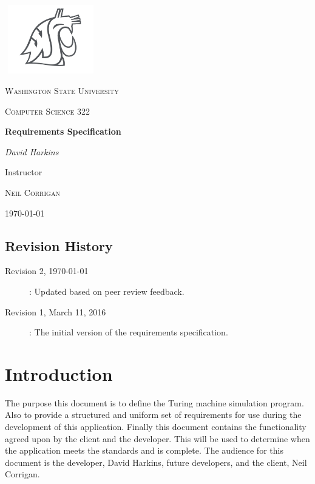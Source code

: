 \documentclass{report}
\begin{document}
 
 \begin{titlepage}
	\centering
    \includegraphics[width=4cm, height=3cm]{head-white-gray-big.png}

	{\scshape\LARGE Washington State University \par}
	\vspace{1cm}
	{\scshape\Large Computer Science 322\par}
	\vspace{1.5cm}
	{\huge\bfseries Requirements Specification\par}
	\vspace{2cm}
	{\Large\itshape David Harkins\par}
	\vfill
	Instructor\par
	\textsc{Neil Corrigan}

	\vfill
	{\large \today\par}
\end{titlepage}
\pagebreak
 
\tableofcontents{}
\pagebreak

\listoffigures

\section*{Revision History}

\begin{description}
\item[Revision 2, \today]: Updated based on peer review feedback. 
\item[Revision 1, March 11, 2016]: The initial version of the requirements specification.
\end{description} 
\pagebreak

\chapter{Introduction}
 	The purpose this document is to define the Turing machine simulation program. Also to provide a structured and uniform set of requirements for use during the development of this application. Finally this document contains the functionality agreed upon by the client and the developer. This will be used to determine when the application meets the standards and is complete. The audience for this document is the developer, David Harkins, future developers, and the client, Neil Corrigan. 
    
\end{document}
